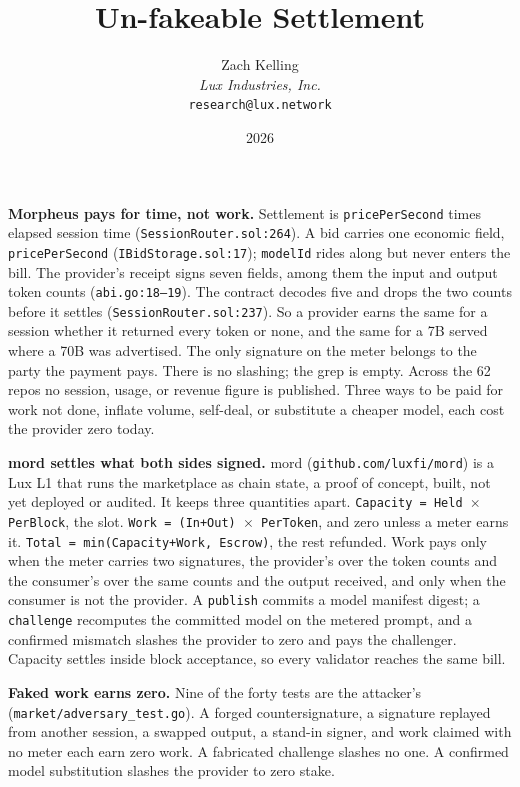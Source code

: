 \documentclass[11pt,a4paper]{article}
\title{Un-fakeable Settlement}
\author{Zach Kelling\\\textit{Lux Industries, Inc.}\\\texttt{research@lux.network}}
\date{2026}
\newcommand{\code}[1]{\texttt{\small #1}}
\newcommand{\prov}[1]{{\color{muted}\footnotesize\sffamily [#1]}}
\begin{document}
\luxcoverpage
\sloppy

\par
\vspace{0.9ex}

\noindent\textbf{Morpheus pays for time, not work.} \prov{verified}
Settlement is \code{pricePerSecond} times elapsed session time
(\code{SessionRouter.sol:264}). A bid carries one economic field,
\code{pricePerSecond} (\code{IBidStorage.sol:17}); \code{modelId} rides along but
never enters the bill. The provider's receipt signs seven fields, among them the
input and output token counts (\code{abi.go:18--19}). The contract decodes five
and drops the two counts before it settles (\code{SessionRouter.sol:237}). So a
provider earns the same for a session whether it returned every token or none,
and the same for a 7B served where a 70B was advertised. The only signature on
the meter belongs to the party the payment pays. There is no slashing; the grep
is empty. Across the 62 repos no session, usage, or revenue figure is published.
Three ways to be paid for work not done, inflate volume, self-deal, or substitute
a cheaper model, each cost the provider zero today.

\vspace{0.5ex}
\noindent\textbf{mord settles what both sides signed.} \prov{verified repo}
mord (\code{github.com/luxfi/mord}) is a Lux L1 that runs the marketplace as chain
state, a proof of concept, built, not yet deployed or audited. It keeps three
quantities apart. \code{Capacity = Held $\times$ PerBlock}, the slot.
\code{Work = (In+Out) $\times$ PerToken}, and zero unless a meter earns it.
\code{Total = min(Capacity+Work, Escrow)}, the rest refunded. Work pays only when
the meter carries two signatures, the provider's over the token counts and the
consumer's over the same counts and the output received, and only when the
consumer is not the provider. A \code{publish} commits a model manifest digest; a
\code{challenge} recomputes the committed model on the metered prompt, and a
confirmed mismatch slashes the provider to zero and pays the challenger. Capacity
settles inside block acceptance, so every validator reaches the same bill.

\vspace{0.5ex}
\noindent\textbf{Faked work earns zero.} \prov{verified: 40 tests pass, 2026-08-29}
Nine of the forty tests are the attacker's (\code{market/adversary\_test.go}). A
forged countersignature, a signature replayed from another session, a swapped
output, a stand-in signer, and work claimed with no meter each earn zero work. A
fabricated challenge slashes no one. A confirmed model substitution slashes the
provider to zero stake.
\end{document}
